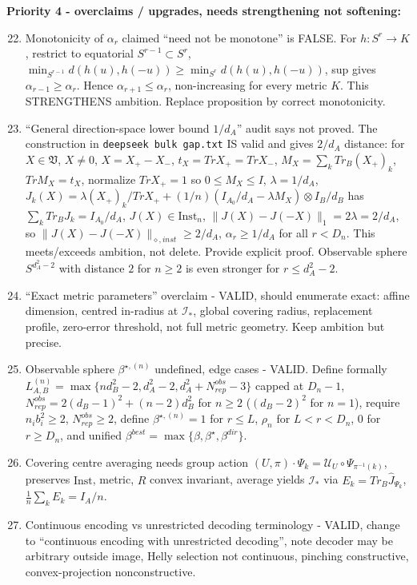 \documentclass[11pt,a4paper]{article}
\newcommand{\Inst}{\mathrm{Inst}}
\begin{document}
\textbf{Priority 4 - overclaims / upgrades, needs strengthening not softening:}
\begin{enumerate}
\setcounter{enumi}{21}
\item Monotonicity of $\alpha_r$ claimed ``need not be monotone'' is FALSE. For $h:S^r\to K$, restrict to equatorial $S^{r-1}\subset S^r$, $\min_{S^{r-1}}d(h(u),h(-u))\ge\min_{S^r}d(h(u),h(-u))$, sup gives $\alpha_{r-1}\ge\alpha_r$. Hence $\alpha_{r+1}\le\alpha_r$, non-increasing for every metric $K$. This STRENGTHENS ambition. Replace proposition by correct monotonicity.
\item ``General direction-space lower bound $1/d_A$'' audit says not proved. The construction in \texttt{deepseek bulk gap.txt} IS valid and gives $2/d_A$ distance: for $X\in\mathfrak V$, $X\ne0$, $X=X_+-X_-$, $t_X=Tr X_+=Tr X_-$, $M_X=\sum_kTr_B(X_+)_k$, $Tr M_X=t_X$, normalize $Tr X_+=1$ so $0\le M_X\le I$, $\lambda=1/d_A$, $J_k(X)=\lambda (X_+)_k/Tr X_+ + (1/n)(I_{A_0}/d_A-\lambda M_X)\otimes I_B/d_B$ has $\sum_kTr_BJ_k=I_{A_0}/d_A$, $J(X)\in\Inst_n$, $\|J(X)-J(-X)\|_1=2\lambda=2/d_A$, so $\|J(X)-J(-X)\|_{\diamond,inst}\ge2/d_A$, $\alpha_r\ge1/d_A$ for all $r<D_n$. This meets/exceeds ambition, not delete. Provide explicit proof. Observable sphere $S^{d_A^2-2}$ with distance $2$ for $n\ge2$ is even stronger for $r\le d_A^2-2$.
\item ``Exact metric parameters'' overclaim - VALID, should enumerate exact: affine dimension, centred in-radius at $\mathcal I_*$, global covering radius, replacement profile, zero-error threshold, not full metric geometry. Keep ambition but precise.
\item Observable sphere $\beta^{\star,(n)}$ undefined, edge cases - VALID. Define formally $L_{A,B}^{(n)}=\max\{nd_B^2-2,d_A^2-2,d_A^2+N_{rep}^{obs}-3\}$ capped at $D_n-1$, $N_{rep}^{obs}=2(d_B-1)^2+(n-2)d_B^2$ for $n\ge2$ ($(d_B-2)^2$ for $n=1$), require $n_ib_i^2\ge2$, $N_{rep}^{obs}\ge2$, define $\beta^{\star,(n)}=1$ for $r\le L$, $\rho_n$ for $L<r<D_n$, $0$ for $r\ge D_n$, and unified $\beta^{best}=\max\{\beta,\beta^\star,\beta^{dir}\}$.
\item Covering centre averaging needs group action $(U,\pi)\cdot\Psi_k=\mathcal U_U\circ\Psi_{\pi^{-1}(k)}$, preserves $\Inst$, metric, $R$ convex invariant, average yields $\mathcal I_*$ via $E_k=Tr_B\widehat J_{\Psi_k}$, $\frac1n\sum_kE_k=I_A/n$.
\item Continuous encoding vs unrestricted decoding terminology - VALID, change to ``continuous encoding with unrestricted decoding'', note decoder may be arbitrary outside image, Helly selection not continuous, pinching constructive, convex-projection nonconstructive.

\end{enumerate}
\end{document}

